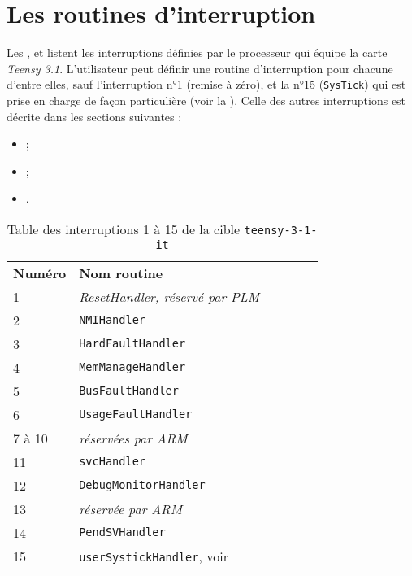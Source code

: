 

\section{Les routines d'interruption}

Les ,  et  listent les interruptions définies par le processeur qui équipe la carte \emph{Teensy 3.1}. L'utilisateur peut définir une routine d'interruption pour chacune d'entre elles, sauf l'interruption n°1 (remise à zéro), et la n°15 (\texttt{SysTick}) qui est prise en charge de façon particulière (voir la ). Celle des autres interruptions est décrite dans les sections suivantes :
\begin{itemize}
  \item {} ;
  \item {} ;
  \item {}.
\end{itemize}


\begin{table}[!t]
  \centering
  \begin{tabular}{llllll}
    \textbf{Numéro}& \textbf{Nom routine} \\
    1  & \emph{ResetHandler, réservé par PLM} \\
    2  & \texttt{NMIHandler}\\
    3  & \texttt{HardFaultHandler}\\
    4  & \texttt{MemManageHandler}\\
    5  & \texttt{BusFaultHandler}\\
    6  & \texttt{UsageFaultHandler}\\
    7 à 10 & \emph{réservées par ARM} \\
    11 & \texttt{svcHandler}\\
    12 & \texttt{DebugMonitorHandler}\\
    13 & \emph{réservée par ARM} \\
    14 & \texttt{PendSVHandler}\\
    15 & \texttt{userSystickHandler}, voir {SystickPourTeensy31It} \\
  \end{tabular}
  \caption{Table des interruptions 1 à 15 de la cible \texttt{teensy-3-1-it}}
  \ligne
\end{table}

